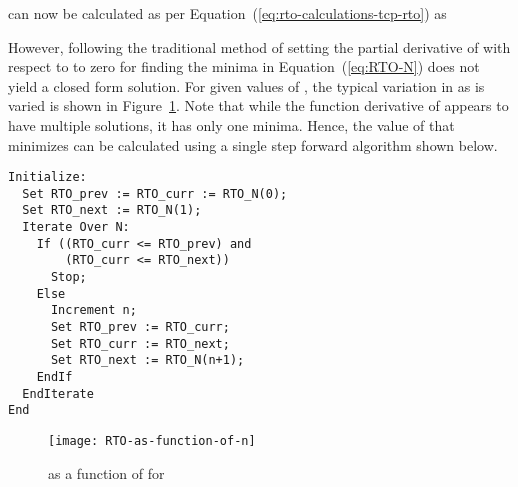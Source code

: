 \documentclass[conference]{IEEEtran}
\begin{document}
 can now be calculated as per Equation~(\ref{eq:rto-calculations-tcp-rto}) as

However, following the traditional method of setting the partial derivative of  with respect to  to zero for finding the minima in Equation~(\ref{eq:RTO-N}) does not yield a closed form solution. For given values of , the typical variation in  as  is varied is shown in Figure~\ref{fig:rto-function-n}. Note that while the function derivative of  appears to have multiple solutions, it has only one minima. Hence, the value of  that minimizes  can be calculated using a single step forward algorithm shown below. 

\begin{verbatim}
Initialize: 
  Set RTO_prev := RTO_curr := RTO_N(0);
  Set RTO_next := RTO_N(1);
  Iterate Over N:
    If ((RTO_curr <= RTO_prev) and 
        (RTO_curr <= RTO_next))
      Stop;
    Else
      Increment n;
      Set RTO_prev := RTO_curr;
      Set RTO_curr := RTO_next;
      Set RTO_next := RTO_N(n+1);
    EndIf
  EndIterate
End
\end{verbatim}

\begin{figure}
  \centering
  \texttt{[image: RTO-as-function-of-n]}
  \caption{ as a function of  for }
  \label{fig:rto-function-n}
\end{figure}
\end{document}
